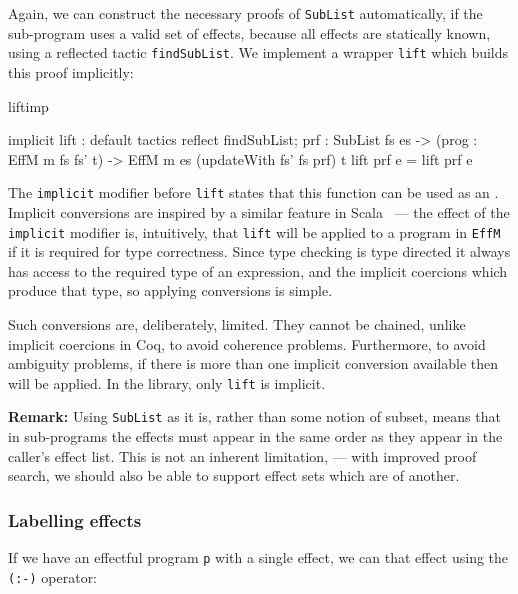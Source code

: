 \noindent
Again, we can construct the necessary proofs of \texttt{SubList} automatically,
if the sub-program uses a valid set of effects, because all effects are
statically known, using a reflected tactic \texttt{findSubList}. We implement
a wrapper \texttt{lift} which builds this proof implicitly:

\begin{SaveVerbatim}{liftimp}

implicit
lift : {default tactics { reflect findSubList; }
          prf : SubList fs es} ->
       (prog : EffM m fs fs' t) -> 
       EffM m es (updateWith fs' fs prf) t
lift {prf} e = lift prf e

\end{SaveVerbatim}

\noindent
The \texttt{implicit} modifier before \texttt{lift} states that this function
can be used as an . Implicit conversions are inspired
by a similar feature in Scala~\cite{Scala} --- the effect of the \texttt{implicit}
modifier is, intuitively, that \texttt{lift} will be applied to
a program in \texttt{EffM} if it is required for type correctness. 
Since type checking is type directed it always has access to the
required type of an expression, and the implicit coercions which produce
that type, so applying conversions is simple.

Such conversions are, deliberately, limited. They cannot be chained, unlike
implicit coercions in Coq, to avoid coherence problems. Furthermore, to avoid
ambiguity problems, if there is more than one implicit conversion available
then  will be applied. In the \Eff{} library, only \texttt{lift}
is implicit.

\textbf{Remark:} Using \texttt{SubList} as it is, rather than some notion
of subset, means that in sub-programs the effects must appear in the same order
as they appear in the caller's effect list. This is not an inherent limitation,
--- with improved proof search, we should also be able to support
effect sets which are  of another.

\subsubsection{Labelling effects}

If we have an effectful program \texttt{p} with a single effect, we can 
 that effect using the \texttt{(:-)} operator:

